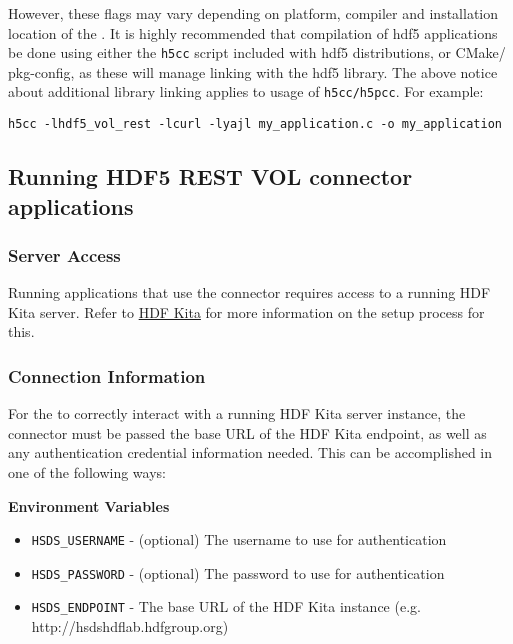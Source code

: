 \documentclass[../users_guide.tex]{subfiles}
\begin{document}
However, these flags may vary depending on platform, compiler and installation
location of the \rvc{}. It is highly recommended that compilation
of \acrshort{hdf5} \rvc{} applications be done using either the
\texttt{h5cc} script included with \acrshort{hdf5} distributions, or CMake/
pkg-config, as these will manage linking with the \acrshort{hdf5} library.
The above notice about additional library linking applies to usage of
\texttt{h5cc/h5pcc}. For example:
\begin{verbatim}
h5cc -lhdf5_vol_rest -lcurl -lyajl my_application.c -o my_application
\end{verbatim}

\subsection{Running HDF5 REST VOL connector applications}
\label{running_rest_vol_apps}

\subsubsection{Server Access}

Running applications that use the \rvc{} connector requires access to a running HDF Kita
server. Refer to \href{https://www.hdfgroup.org/hdf-kita}{HDF Kita} for more information on
the setup process for this.

\subsubsection{Connection Information}

For the \rvc{} to correctly interact with a running HDF Kita server instance, the connector
must be passed the base URL of the HDF Kita endpoint, as well as any authentication credential
information needed. This can be accomplished in one of the following ways:

\textbf{Environment Variables}

\begin{itemize}
  \item \texttt{HSDS\_USERNAME} - (optional) The username to use for authentication
  \item \texttt{HSDS\_PASSWORD} - (optional) The password to use for authentication
  \item \texttt{HSDS\_ENDPOINT} - The base URL of the HDF Kita instance (e.g. http://hsdshdflab.hdfgroup.org)
\end{itemize}
\end{document}
